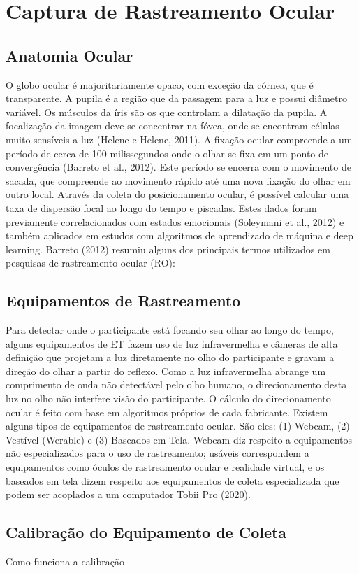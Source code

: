 \chapter{Captura de Rastreamento Ocular}

\section{Anatomia Ocular}
O globo ocular é majoritariamente opaco, com exceção da córnea, que é transparente. 
A pupila é a região que da passagem para a luz e possui diâmetro variável. Os músculos da íris são os que controlam a dilatação da pupila. 
A focalização da imagem deve se concentrar na fóvea, onde se encontram células muito sensíveis a luz (Helene e Helene, 2011). 
A fixação ocular compreende a um período de cerca de 100 milissegundos onde o olhar se fixa em um ponto de convergência (Barreto et al., 2012). 
Este período se encerra com o movimento de sacada, que compreende ao movimento rápido até uma nova fixação do olhar em outro local.
Através da coleta do posicionamento ocular, é possível calcular uma taxa de dispersão focal ao longo do tempo e piscadas. 
Estes dados foram previamente correlacionados com estados emocionais (Soleymani et al., 2012) e 
também aplicados em estudos com algoritmos de aprendizado de máquina e deep learning. Barreto (2012)
resumiu alguns dos principais termos utilizados em pesquisas de rastreamento ocular (RO):

\section{Equipamentos de Rastreamento}
Para detectar onde o participante está focando seu olhar ao longo do tempo, alguns equipamentos de ET
 fazem uso de luz infravermelha e câmeras de alta definição que projetam a luz
  diretamente no olho do participante e gravam a direção do olhar a partir do reflexo. 
  Como a luz infravermelha abrange um comprimento de onda não detectável pelo olho humano, 
  o direcionamento desta luz no olho não interfere visão do participante. 
  O cálculo do direcionamento ocular é feito com base em algoritmos próprios de cada fabricante. 
  Existem alguns tipos de equipamentos de rastreamento ocular. São eles: (1) Webcam, (2) Vestível (Werable) e (3) Baseados em Tela. 
  Webcam diz respeito a equipamentos não especializados para o uso de rastreamento; usáveis correspondem a equipamentos como óculos de rastreamento ocular 
  e realidade virtual, e os baseados em tela dizem respeito aos equipamentos de coleta especializada que podem ser acoplados a um computador Tobii Pro (2020).

  \section{Calibração do Equipamento de Coleta}
  Como funciona a calibração